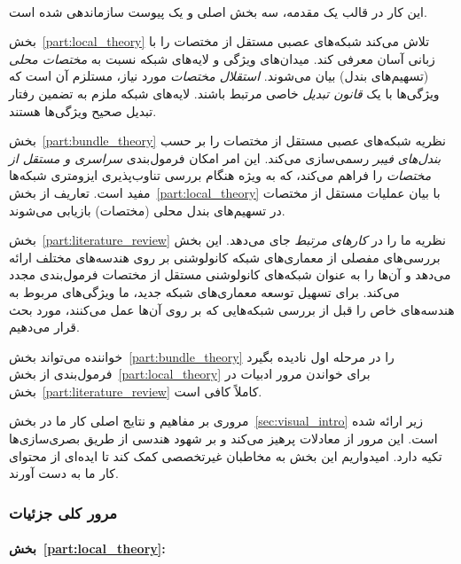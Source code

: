 

\newpage
\setcounter{tocdepth}{2} %
\tableofcontents

~ %

این کار در قالب یک مقدمه، سه بخش اصلی و یک پیوست سازماندهی شده است.

بخش~\ref{part:local_theory} تلاش می‌کند شبکه‌های عصبی مستقل از مختصات را با زبانی آسان معرفی کند.
میدان‌های ویژگی و لایه‌های شبکه نسبت به \emph{مختصات محلی} (تسهیم‌های بندل) بیان می‌شوند.
\emph{استقلال مختصات} مورد نیاز، مستلزم آن است که ویژگی‌ها با یک \emph{قانون تبدیل} خاصی مرتبط باشند.
لایه‌های شبکه ملزم به تضمین رفتار تبدیل صحیح ویژگی‌ها هستند.

بخش~\ref{part:bundle_theory} نظریه شبکه‌های عصبی مستقل از مختصات را بر حسب \emph{بندل‌های فیبر} رسمی‌سازی می‌کند.
این امر امکان فرمول‌بندی \emph{سراسری و مستقل از مختصات} را فراهم می‌کند، که به ویژه هنگام بررسی تناوب‌پذیری ایزومتری شبکه‌ها مفید است.
تعاریف از بخش~\ref{part:local_theory} با بیان عملیات مستقل از مختصات در تسهیم‌های بندل محلی (مختصات) بازیابی می‌شوند.

بخش~\ref{part:literature_review} نظریه ما را در \emph{کارهای مرتبط} جای می‌دهد.
این بخش بررسی‌های مفصلی از معماری‌های شبکه کانولوشنی بر روی هندسه‌های مختلف ارائه می‌دهد و آن‌ها را به عنوان شبکه‌های کانولوشنی مستقل از مختصات فرمول‌بندی مجدد می‌کند.
برای تسهیل توسعه معماری‌های شبکه جدید، ما ویژگی‌های مربوط به هندسه‌های خاص را قبل از بررسی شبکه‌هایی که بر روی آن‌ها عمل می‌کنند، مورد بحث قرار می‌دهیم.

خواننده می‌تواند بخش~\ref{part:bundle_theory} را در مرحله اول نادیده بگیرد
فرمول‌بندی از بخش~\ref{part:local_theory} برای خواندن مرور ادبیات در بخش~\ref{part:literature_review} کاملاً کافی است.

مروری بر مفاهیم و نتایج اصلی کار ما در بخش~\ref{sec:visual_intro} زیر ارائه شده است.
این مرور از معادلات پرهیز می‌کند و بر شهود هندسی از طریق بصری‌سازی‌ها تکیه دارد.
امیدواریم این بخش به مخاطبان غیرتخصصی کمک کند تا ایده‌ای از محتوای کار ما به دست آورند.


\subsubsection*{مرور کلی جزئیات}


\paragraph{بخش~\ref{part:local_theory}:}

